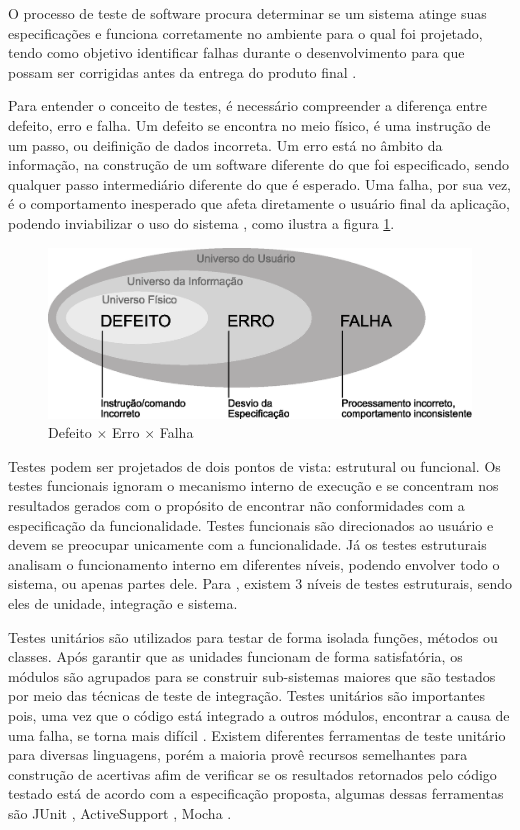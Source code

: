 O processo de teste de software procura determinar se um sistema atinge suas especificações e funciona corretamente no ambiente para o qual foi projetado, tendo como objetivo identificar falhas durante o desenvolvimento para que possam ser corrigidas antes da entrega do produto final  \cite{neto2005}. 

Para entender o conceito de testes, é necessário compreender a diferença entre defeito, erro e falha. Um defeito se encontra no meio físico, é uma instrução de um passo, ou deifinição de dados incorreta. Um erro está no âmbito da informação, na construção de um software diferente do que foi especificado, sendo qualquer passo intermediário diferente do que é esperado. Uma falha, por sua vez, é o comportamento inesperado que afeta diretamente o usuário final da aplicação, podendo inviabilizar o uso do sistema \cite{ieee1990}, como ilustra a figura \ref{fig:erro}. 

\begin{figure}[h!]
	\centering
  	\includegraphics[width=.9\linewidth]{figuras/erro.eps}
  	\caption{Defeito \(\times\) Erro \(\times\) Falha}
  	\label{fig:erro}
\end{figure}

Testes podem ser projetados de dois pontos de vista: estrutural ou funcional. Os testes funcionais ignoram o mecanismo interno de execução e se concentram nos resultados gerados com o propósito de encontrar não conformidades com a especificação da funcionalidade. Testes funcionais são direcionados ao usuário e devem se preocupar unicamente com a funcionalidade. Já os testes estruturais analisam o funcionamento interno em diferentes níveis, podendo envolver todo o sistema, ou apenas partes dele. Para \cite{naik2008}, existem 3 níveis de testes estruturais, sendo eles de unidade, integração e sistema.

Testes unitários são utilizados para testar de forma isolada funções, métodos ou classes. Após garantir que as unidades funcionam de forma satisfatória, os módulos são agrupados para se construir sub-sistemas maiores que são testados por meio das técnicas de teste de integração. Testes unitários são importantes pois, uma vez que o código está integrado a outros módulos, encontrar a causa de uma falha, se torna mais difícil \cite{naik2008}. Existem diferentes ferramentas de teste unitário para diversas linguagens, porém a maioria provê recursos semelhantes para construção de acertivas afim de verificar se os resultados retornados pelo código testado está de acordo com a especificação proposta, algumas dessas ferramentas são JUnit \cite{junit2015}, ActiveSupport \cite{activetest2015}, Mocha \cite{mocha2015}.

